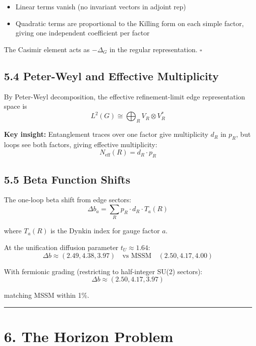 \begin{itemize}
\tightlist
\item
  Linear terms vanish (no invariant vectors in adjoint rep)
\item
  Quadratic terms are proportional to the Killing form on each simple factor, giving one independent coefficient per factor
\end{itemize}

The Casimir element acts as \(-\Delta_G\) in the regular representation. \(\square\)

\subsection{5.4 Peter-Weyl and Effective Multiplicity}\label{54-peter-weyl-and-effective-multiplicity}

By Peter-Weyl decomposition, the effective refinement-limit edge representation space is
\[L^2(G) \cong \bigoplus_R V_R \otimes V_R^*\]

\textbf{Key insight:} Entanglement traces over one factor give multiplicity \(d_R\) in \(p_R\), but loops see both factors, giving effective multiplicity: \[N_{\text{eff}}(R) = d_R \cdot p_R\]

\subsection{5.5 Beta Function Shifts}\label{55-beta-function-shifts}

The one-loop beta shift from edge sectors: \[\Delta b_a = \sum_R p_R \cdot d_R \cdot T_a(R)\]

where \(T_a(R)\) is the Dynkin index for gauge factor \(a\).

At the unification diffusion parameter \(t_U \approx 1.64\): \[\Delta b \approx (2.49, 4.38, 3.97) \quad \text{vs MSSM} \quad (2.50, 4.17, 4.00)\]

With fermionic grading (restricting to half-integer SU(2) sectors): \[\Delta b \approx (2.50, 4.17, 3.97)\]

matching MSSM within 1\%.

\begin{center}\rule{0.5\linewidth}{0.5pt}\end{center}

\section{6. The Horizon Problem}\label{6-the-horizon-problem}

